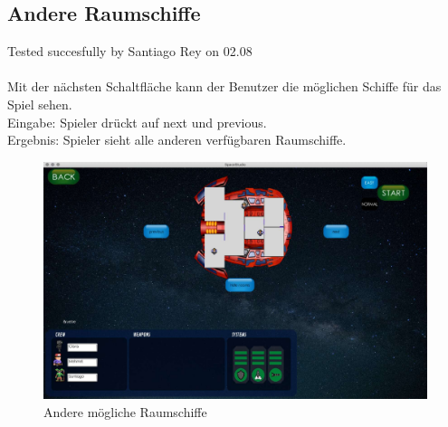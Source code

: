 \documentclass[12pt]{article}
\begin{document}
\newpage

\subsection{Andere Raumschiffe}
Tested succesfully by Santiago Rey on 02.08\\\\
Mit der nächsten Schaltfläche kann der Benutzer die möglichen Schiffe für das Spiel sehen.\\
Eingabe: Spieler drückt auf next und previous.\\
Ergebnis: Spieler sieht alle anderen verfügbaren Raumschiffe.
\begin{figure}
\centering
\includegraphics[scale=0.4]{TestProtocolBilder/next.jpg}
\caption{Andere mögliche Raumschiffe}
\end{figure}

\newpage
\end{document}
